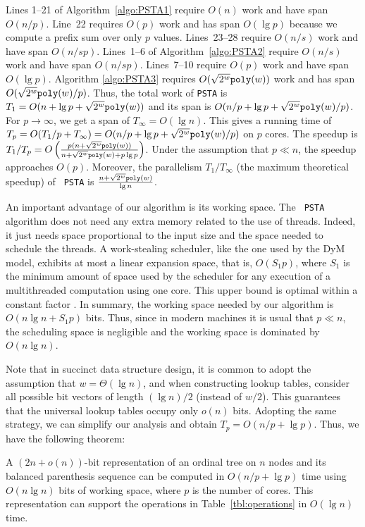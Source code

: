 Lines 1--21 of Algorithm~\ref{algo:PSTA1} require $O(n)$ work and have
span~$O(n/p)$.
Line~22 requires $O(p)$ work and has span $O(\lg p)$ because we compute
a prefix sum over only $p$ values.
Lines~23--28 require $O(n/s)$ work and have span $O(n/sp)$.
Lines~1--6 of Algorithm~\ref{algo:PSTA2} require $O(n/s)$ work and have
span $O(n/sp)$.
Lines~7--10 require $O(p)$ work and have span $O(\lg p)$.
Algorithm \ref{algo:PSTA3} requires $O(\sqrt{2^w}\mathtt{poly}(w))$ work and
has span $O(\sqrt{2^{w}}\mathtt{poly}(w)/p)$.
Thus, the total work of {\tt PSTA} is $T_1 = O(n + \lg p + \sqrt{2^w}\mathtt{poly}(w))$
and its span is $O(n/p + \lg p + \sqrt{2^w}\mathtt{poly}(w)/p)$.
For $p \rightarrow \infty$, we get a span of $T_\infty = O(\lg n)$.
This gives a running time of $T_p = O(T_1/p + T_\infty) =
O(n/p + \lg p + \sqrt{2^w}\mathtt{poly}(w)/p)$ on $p$ cores.
The speedup is $T_1/T_p = O\left(\frac{p(n+\sqrt{2^{w}}\mathtt{poly}(w))}{n+\sqrt{2^{w}}\mathtt{poly}(w)+p\lg
p}\right)$. Under the assumption that $p\ll n$, the speedup approaches
$O(p)$. Moreover, the
parallelism $T_1/T_{\infty}$ (the maximum theoretical speedup) of {\tt
PSTA} is $\frac{n+\sqrt{2^{w}}\mathtt{poly}(w)}{\lg n}$.

An important advantage of our algorithm is its working space. The {\tt
PSTA} algorithm does not need any extra memory related to the use of
threads. Indeed, it just needs space proportional to the input size
and the space needed to schedule the threads. A work-stealing
scheduler, like the one used by the DyM model, exhibits at most a
linear expansion space, that is, $O(S_1p)$, where $S_1$ is the minimum
amount of space used by the scheduler for any execution of a
multithreaded computation using one core. This upper bound is
optimal within a constant factor
\cite{Blumofe:1999:SMC:324133.324234}. In summary, the working space
needed by our algorithm is $O(n\lg n+S_1p)$ bits. Thus, since in modern
machines it is usual that $p\ll n$, the scheduling space is negligible
and the working space is dominated by $O(n\lg n)$.

Note that in succinct data structure design, it is common to adopt the assumption that $w = \Theta(\lg n)$, and when constructing lookup tables, consider all possible bit vectors of length $(\lg n)/2$ (instead of $w/2$).
This guarantees that the universal lookup tables occupy only $o(n)$ bits.
Adopting the same strategy, we can simplify our analysis and obtain
$T_p = O(n/p + \lg p)$.
Thus, we have the following theorem:
\begin{theorem}\label{lem:lg}
A $(2n+o(n))$-bit representation of an ordinal tree on $n$ nodes and its balanced parenthesis sequence can be computed in $O(n/p + \lg p)$ time using $O(n\lg n)$ bits of working space, where $p$ is the number of cores.
This representation can support the operations in Table~\ref{tbl:operations} in $O(\lg n)$ time.
\end{theorem}